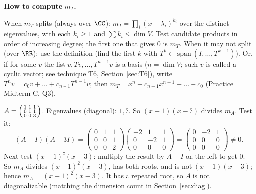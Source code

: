 \documentclass[10pt]{scrartcl}
\DeclareMathOperator{\spn}{span}
\begin{document}
\textbf{How to compute $m_T$.}
\begin{itemize}
  \ii When $m_T$ splits (always over $\CC$): $m_T=\prod_i(x-\lambda_i)^{k_i}$ over the distinct eigenvalues, with each $k_i\ge1$ and $\sum k_i\le\dim V$. Test candidate products in order of increasing degree; the first one that gives $0$ is $m_T$.
  \ii When it may not split (over $\RR$): use the definition (find the first $k$ with $T^k\in\spn(I,\dots,T^{k-1})$). Or, if for some $v$ the list $v,Tv,\dots,T^{n-1}v$ is a basis ($n=\dim V$; such $v$ is called a cyclic vector; see technique T6, Section~\ref{sec:T6}), write $T^nv=c_0v+\dots+c_{n-1}T^{n-1}v$; then $m_T=x^n-c_{n-1}x^{n-1}-\dots-c_0$ (Practice Midterm C, Q3).
\end{itemize}

\begin{example*}
  $A=\begin{psmallmatrix}1&1&1\\0&1&1\\0&0&3\end{psmallmatrix}$. Eigenvalues (diagonal): $1,3$. So $(x-1)(x-3)$ divides $m_A$. Test it:
  \[ (A-I)(A-3I)=\begin{pmatrix}0&1&1\\0&0&1\\0&0&2\end{pmatrix}\begin{pmatrix}-2&1&1\\0&-2&1\\0&0&0\end{pmatrix}=\begin{pmatrix}0&-2&1\\0&0&0\\0&0&0\end{pmatrix}\ne0. \]
  Next test $(x-1)^2(x-3)$: multiply the result by $A-I$ on the left to get $0$. So $m_A$ divides $(x-1)^2(x-3)$, has both roots, and is not $(x-1)(x-3)$; hence $m_A=(x-1)^2(x-3)$. It has a repeated root, so $A$ is not diagonalizable (matching the dimension count in Section~\ref{sec:diag}).
\end{example*}
\end{document}
